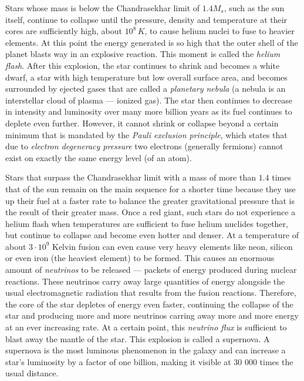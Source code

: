 
Stars whose mass is below the Chandrasekhar limit of $1.4 M_s$, such as the sun itself, continue to collapse until the pressure, density and temperature at their cores are sufficiently high, about $10^8\, K$, to cause helium nuclei to fuse to heavier elements. At this point the energy generated is so high that the outer shell of the planet blasts way in an explosive reaction. This moment is called the \emph{helium flash}. After this explosion, the star continues to shrink and becomes a white dwarf, a star with high temperature but low overall surface area, and becomes surrounded by ejected gases that are called a \emph{planetary nebula} (a nebula is an interstellar cloud of plasma --- ionized gas). The star then continues to decrease in intensity and luminosity over many more billion years as its fuel continues to deplete even further. However, it cannot shrink or collapse beyond a certain minimum that is mandated by the \emph{Pauli exclusion principle}, which states that due to \emph{electron degeneracy pressure} two electrons (generally fermions) cannot exist on exactly the same energy level (of an atom).


Stars that surpass the Chandrasekhar limit with a mass of more than $1.4$ times that of the sun remain on the main sequence for a shorter time because they use up their fuel at a faster rate to balance the greater gravitational pressure that is the result of their greater mass. Once a red giant, such stars do not experience a helium flash when temperatures are sufficient to fuse helium nuclides together, but continue to collapse and become even hotter and denser. At a temperature of about $3 \cdot 10^9$ Kelvin fusion can even cause very heavy elements like neon, silicon or even iron (the heaviest element) to be formed. This causes an enormous amount of \emph{neutrinos} to be released --- packets of energy produced during nuclear reactions. These neutrinos carry away large quantities of energy alongside the usual electromagnetic radiation that results from the fusion reactions. Therefore, the core of the star depletes of energy even faster, continuing the collapse of the star and producing more and more neutrinos carring away more and more energy at an ever increasing rate. At a certain point, this \emph{neutrino flux} is sufficient to blast away the mantle of the star. This explosion is called a supernova. A supernova is the most luminous phenomenon in the galaxy and can increase a star's luminosity by a factor of one billion, making it visible at 30 000 times the usual distance.


